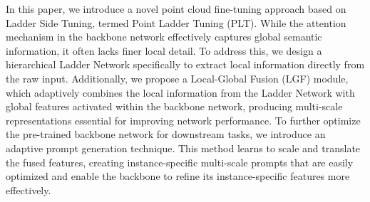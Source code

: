 
In this paper, we introduce a novel point cloud fine-tuning approach based on Ladder Side Tuning, termed Point Ladder Tuning (PLT). While the attention mechanism in the backbone network effectively captures global semantic information, it often lacks finer local detail. To address this, we design a hierarchical Ladder Network specifically to extract local information directly from the raw input. Additionally, we propose a Local-Global Fusion (LGF) module, which adaptively combines the local information from the Ladder Network with global features activated within the backbone network, producing multi-scale representations essential for improving network performance. 
To further optimize the pre-trained backbone network for downstream tasks, we introduce an adaptive prompt generation technique. This method learns to scale and translate the fused features, creating instance-specific multi-scale prompts that are easily optimized and enable the backbone to refine its instance-specific features more effectively.

% 

